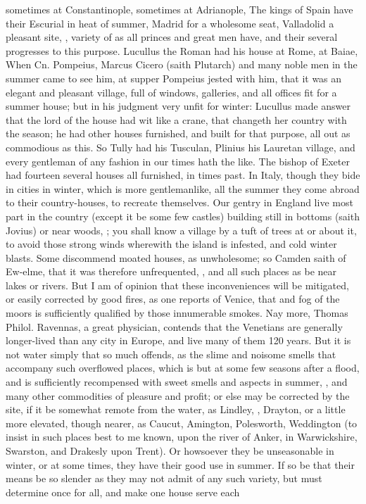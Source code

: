 {sometimes at Constantinople, sometimes at Adrianople, \etc{} The kings of Spain have their Escurial in heat of summer, Madrid for a wholesome seat, Valladolid a pleasant site, \etc{}, variety of  as all princes and great men have, and their several progresses to this purpose. Lucullus the Roman had his house at Rome, at Baiae, \etc{} When Cn. Pompeius, Marcus Cicero (saith Plutarch) and many noble men in the summer came to see him, at supper Pompeius jested with him, that it was an elegant and pleasant village, full of windows, galleries, and all offices fit for a summer house; but in his judgment very unfit for winter: Lucullus made answer that the lord of the house had wit like a crane, that changeth her country with the season; he had other houses furnished, and built for that purpose, all out as commodious as this. So Tully had his Tusculan, Plinius his Lauretan village, and every gentleman of any fashion in our times hath the like. The bishop of Exeter had fourteen several houses all furnished, in times past. In Italy, though they bide in cities in winter, which is more gentlemanlike, all the summer they come abroad to their country-houses, to recreate themselves. Our gentry in England live most part in the country (except it be some few castles) building still in bottoms (saith Jovius) or near woods, ; you shall know a village by a tuft of trees at or about it, to avoid those strong winds wherewith the island is infested, and cold winter blasts. Some discommend moated houses, as unwholesome; so Camden saith of Ew-elme, that it was therefore unfrequented, , and all such places as be near lakes or rivers. But I am of opinion that these inconveniences will be mitigated, or easily corrected by good fires, as one reports of Venice, that  and fog of the moors is sufficiently qualified by those innumerable smokes. Nay more, Thomas Philol. Ravennas, a great physician, contends that the Venetians are generally longer-lived than any city in Europe, and live many of them 120 years. But it is not water simply that so much offends, as the slime and noisome smells that accompany such overflowed places, which is but at some few seasons after a flood, and is sufficiently recompensed with sweet smells and aspects in summer, , and many other commodities of pleasure and profit; or else may be corrected by the site, if it be somewhat remote from the water, as Lindley, , Drayton, or a little more elevated, though nearer, as Caucut, Amington, Polesworth, Weddington (to insist in such places best to me known, upon the river of Anker, in Warwickshire, Swarston, and Drakesly upon Trent). Or howsoever they be unseasonable in winter, or at some times, they have their good use in summer. If so be that their means be so slender as they may not admit of any such variety, but must determine once for all, and make one house serve each }
